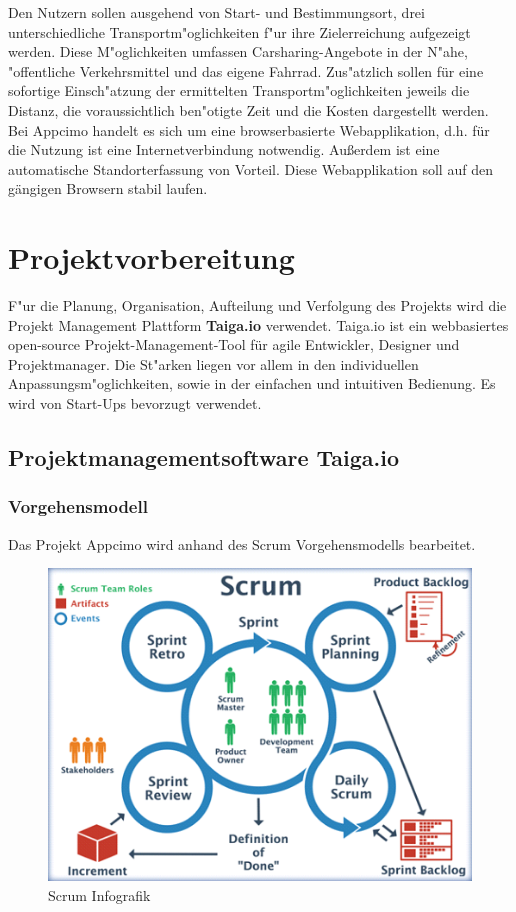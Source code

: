 \documentclass[a4paper, 11pt]{scrreprt}
\begin{document}
Den Nutzern sollen ausgehend von Start- und Bestimmungsort, drei unterschiedliche Transportm"oglichkeiten f"ur ihre Zielerreichung aufgezeigt werden. Diese M"oglichkeiten umfassen Carsharing-Angebote in der N"ahe, "offentliche Verkehrsmittel und das eigene Fahrrad. Zus"atzlich sollen für eine sofortige Einsch"atzung der ermittelten Transportm"oglichkeiten jeweils die Distanz, die voraussichtlich ben"otigte Zeit und die Kosten dargestellt werden. \\

Bei Appcimo handelt es sich um eine browserbasierte Webapplikation, d.h. für die Nutzung ist eine Internetverbindung notwendig. Außerdem ist eine automatische Standorterfassung von Vorteil.
Diese Webapplikation soll auf den gängigen Browsern stabil laufen.


\chapter{Projektvorbereitung}
F"ur die Planung, Organisation, Aufteilung und Verfolgung des Projekts wird die Projekt Management Plattform \textbf{Taiga.io} verwendet. Taiga.io ist ein webbasiertes open-source Projekt-Management-Tool für agile Entwickler, Designer und Projektmanager. Die St"arken liegen vor allem in den individuellen Anpassungsm"oglichkeiten, sowie in der einfachen und intuitiven Bedienung. Es wird von Start-Ups bevorzugt verwendet.


\section{Projektmanagementsoftware Taiga.io}

\subsection{Vorgehensmodell}
Das Projekt Appcimo wird anhand des Scrum Vorgehensmodells bearbeitet. 

\begin{figure} [H]
\begin{center}


\includegraphics[width=12cm]{Scrum.png}
\caption{Scrum Infografik}
\label{Scrum_logo}

\end{center}
\end{figure}
\end{document}
